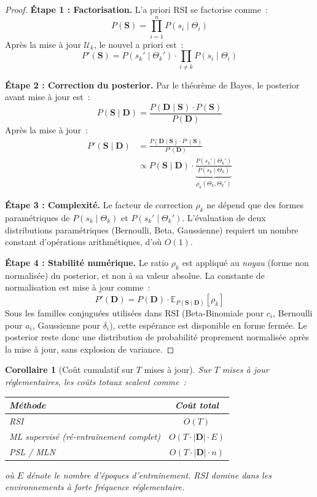 \documentclass[letterpaper]{article}
\newtheorem{corollaire}{Corollaire}[theoreme]
\begin{document}
\begin{proof}
\textbf{\'Etape 1 : Factorisation.}
L'a priori RSI se factorise comme~:
\[
  P(\mathbf{S}) = \prod_{i=1}^n P(s_i \mid \Theta_i)
\]
Apr\`es la mise \`a jour $\mathcal{U}_k$, le nouvel a priori est~:
\[
  P'(\mathbf{S}) = P(s_k' \mid \Theta_k') \cdot \prod_{i \neq k} P(s_i \mid \Theta_i)
\]

\textbf{\'Etape 2 : Correction du posterior.}
Par le th\'eor\`eme de Bayes, le posterior avant mise \`a jour est~:
\[
  P(\mathbf{S} \mid \mathbf{D}) = \frac{P(\mathbf{D} \mid \mathbf{S})
  \cdot P(\mathbf{S})}{P(\mathbf{D})}
\]
Apr\`es la mise \`a jour~:
\begin{align*}
  P'(\mathbf{S} \mid \mathbf{D})
  &= \frac{P(\mathbf{D} \mid \mathbf{S}) \cdot P'(\mathbf{S})}{P'(\mathbf{D})} \\
  &\propto P(\mathbf{S} \mid \mathbf{D}) \cdot
    \underbrace{\frac{P(s_k' \mid \Theta_k')}{P(s_k \mid \Theta_k)}}_{\rho_k(\Theta_k, \Theta_k')}
\end{align*}

\textbf{\'Etape 3 : Complexit\'e.}
Le facteur de correction $\rho_k$ ne d\'epend que des formes
param\'etriques de $P(s_k \mid \Theta_k)$ et $P(s_k' \mid \Theta_k')$.
L'\'evaluation de deux distributions param\'etriques (Bernoulli,
Beta, Gaussienne) requiert un nombre constant d'op\'erations
arithm\'etiques, d'o\`u $O(1)$.

\textbf{\'Etape 4 : Stabilit\'e num\'erique.}
Le ratio $\rho_k$ est appliqu\'e au \emph{noyau} (forme non
normalis\'ee) du posterior, et non \`a sa valeur absolue.
La constante de normalisation est mise \`a jour comme~:
\[
  P'(\mathbf{D}) = P(\mathbf{D}) \cdot
  \mathbb{E}_{P(\mathbf{S} \mid \mathbf{D})}[\rho_k]
\]
Sous les familles conjugu\'ees utilis\'ees dans RSI (Beta-Binomiale
pour $c_i$, Bernoulli pour $a_i$, Gaussienne pour $\delta_i$), cette
esp\'erance est disponible en forme ferm\'ee. Le posterior reste donc
une distribution de probabilit\'e proprement normalis\'ee apr\`es la
mise \`a jour, sans explosion de variance.
\end{proof}

\begin{corollaire}[Co\^ut cumulatif sur $T$ mises \`a jour]
Sur $T$ mises \`a jour r\'eglementaires, les co\^uts totaux scalent
comme~:
\begin{center}
\begin{tabular}{lc}
\toprule
\textbf{M\'ethode} & \textbf{Co\^ut total} \\
\midrule
RSI & $O(T)$ \\
ML supervis\'e (r\'e-entra\^inement complet) & $O(T \cdot |\mathbf{D}| \cdot E)$ \\
PSL / MLN & $O(T \cdot |\mathbf{D}| \cdot n)$ \\
\bottomrule
\end{tabular}
\end{center}
o\`u $E$ d\'enote le nombre d'\'epoques d'entra\^inement. RSI domine
dans les environnements \`a forte fr\'equence r\'eglementaire.
\end{corollaire}
\end{document}
